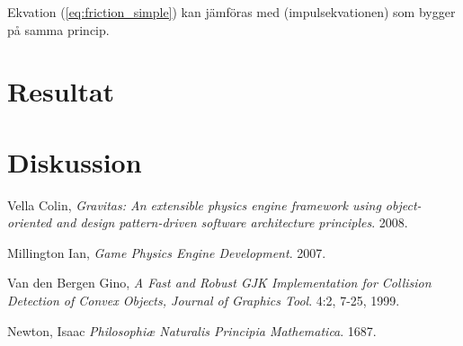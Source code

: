 \documentclass[a4paper,12pt,twopage,swedish]{article}
\begin{document}
Ekvation (\ref{eq:friction_simple}) kan jämföras med (impulsekvationen) som bygger på samma princip.

\section{Resultat}
\section{Diskussion}
\clearpage
\begin{thebibliography}{9}

  Vella Colin,
  \emph{Gravitas: An extensible physics engine framework using object-oriented and design pattern-driven software architecture principles}.
  2008.

  Millington Ian,
  \emph{Game Physics Engine Development}.
  2007.

  Van den Bergen Gino,
  \emph{A Fast and Robust GJK Implementation for Collision Detection of Convex Objects, Journal of Graphics Tool}.
  4:2, 7-25,
  1999.

  Newton, Isaac
  \emph{Philosophiæ Naturalis Principia Mathematica}.
  1687.

\end{thebibliography}
\end{document}
